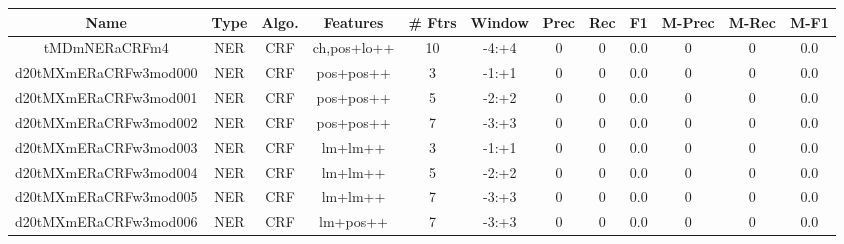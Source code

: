 \documentclass[a4paper]{article}
\begin{document}
\begin{landscape}
\begin{center}
\begin{tabular}{ |c|c|c|c|c|c|c|c|c|c|c|c|}
 \hline
\end{tabular}
\end{center}




\begin{center}
\begin{tabular}{ |c|c|c|c|c|c|c|c|c|c|c|c|} 
 \hline
 	Name & Type & Algo. & Features & \# Ftrs & Window & Prec & Rec & F1 & M-Prec & M-Rec & M-F1\\
 \hline

 	

 
 	
 	\small{ tMDmNERaCRFm4 } & \small{ NER} & \small{  CRF }  & ch,pos+lo++  &  10 &  \small{  -4:+4 }  &  0 & 0 & 0.0  &  0 & 0 & 0.0 \\
 	

 
 	
 	\small{ d20tMXmERaCRFw3mod000 } & \small{ NER} & \small{  CRF }  & pos+pos++  &  3 &  \small{  -1:+1 }  &  0 & 0 & 0.0  &  0 & 0 & 0.0 \\
 	

 
 	
 	\small{ d20tMXmERaCRFw3mod001 } & \small{ NER} & \small{  CRF }  & pos+pos++  &  5 &  \small{  -2:+2 }  &  0 & 0 & 0.0  &  0 & 0 & 0.0 \\
 	

 
 	
 	\small{ d20tMXmERaCRFw3mod002 } & \small{ NER} & \small{  CRF }  & pos+pos++  &  7 &  \small{  -3:+3 }  &  0 & 0 & 0.0  &  0 & 0 & 0.0 \\
 	

 
 	
 	\small{ d20tMXmERaCRFw3mod003 } & \small{ NER} & \small{  CRF }  & lm+lm++  &  3 &  \small{  -1:+1 }  &  0 & 0 & 0.0  &  0 & 0 & 0.0 \\
 	

 
 	
 	\small{ d20tMXmERaCRFw3mod004 } & \small{ NER} & \small{  CRF }  & lm+lm++  &  5 &  \small{  -2:+2 }  &  0 & 0 & 0.0  &  0 & 0 & 0.0 \\
 	

 
 	
 	\small{ d20tMXmERaCRFw3mod005 } & \small{ NER} & \small{  CRF }  & lm+lm++  &  7 &  \small{  -3:+3 }  &  0 & 0 & 0.0  &  0 & 0 & 0.0 \\
 	

 
 	
 	\small{ d20tMXmERaCRFw3mod006 } & \small{ NER} & \small{  CRF }  & lm+pos++  &  7 &  \small{  -3:+3 }  &  0 & 0 & 0.0  &  0 & 0 & 0.0 \\
 	


\end{tabular}
\end{center}
\end{landscape}
\end{document}
